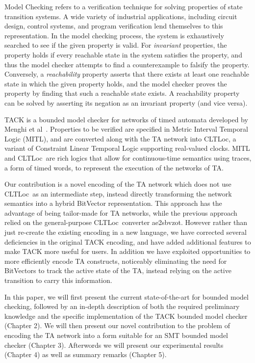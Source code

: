 \documentclass[a4paper,11pt]{report}
\theoremstyle{definition}
\newcommand{\cltloc}{CLTLoc}
\newcommand{\aez}{ae2sbvzot}
\begin{document}
Model Checking refers to a verification technique for solving properties of
state transition systems. A wide variety of industrial applications, including
circuit design, control systems, and program verification lend themselves to
this representation. In the model checking process, the system is exhaustively
searched to see if the given property is valid. For \emph{invariant} properties,
the property holds if every reachable state in the system satisfies the
property, and thus the model checker attempts to find a counterexample to
falsify the property. Conversely, a \emph{reachability} property asserts that
there exists at least one reachable state in which the given property holds, and
the model checker proves the property by finding that such a reachable state
exists. A reachability property can be solved by asserting its negation as an
invariant property (and vice versa).


TACK is a bounded model checker for networks of timed automata developed by
Menghi et al~\cite{tack20}. Properties to be verified are specified in Metric
Interval Temporal Logic (MITL), and are converted along with the TA network into
\cltloc, a variant of Constraint Linear Temporal Logic supporting real-valued
clocks. MITL and \cltloc\ are rich logics that allow for continuous-time
semantics using traces, a form of timed words, to represent the execution of the
networks of TA.

Our contribution is a novel encoding of the TA network which does not use
\cltloc\ as an intermediate step, instead directly transforming the network
semantics into a hybrid BitVector representation. This approach has the
advantage of being tailor-made for TA networks, while the previous approach
relied on the general-purpose \cltloc\ converter \aez. However rather than just
re-create the existing encoding in a new language, we have corrected several
deficiencies in the original TACK encoding, and have added additional features
to make TACK more useful for users. In addition we have exploited opportunities
to more efficiently encode TA constructs, noticeably eliminating the need for
BitVectors to track the active state of the TA, instead relying on the active
transition to carry this information.

In this paper, we will first present the current state-of-the-art for bounded
model checking, followed by an in-depth description of both the required
preliminary knowledge and the specific implementation of the TACK bounded model
checker (Chapter 2). We will then present our novel contribution to the problem
of encoding the TA network into a form suitable for an SMT bounded model checker
(Chapter 3). Afterwords we will present our experimental results (Chapter 4) as
well as summary remarks (Chapter 5).
\end{document}
